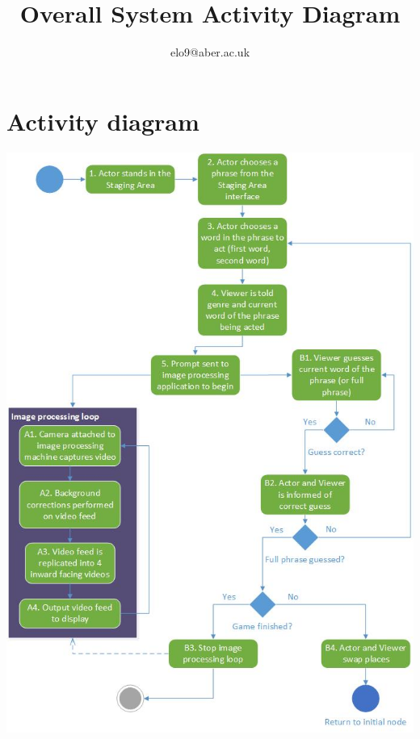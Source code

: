 \documentclass{article}
\title{Overall System Activity Diagram}
\author{elo9@aber.ac.uk}
\begin{document}
\maketitle
\tableofcontents

\newpage

\section{Activity diagram}
\includegraphics[width=\textwidth]{SystemActivityDiagramImage}

\newpage
\end{document}
